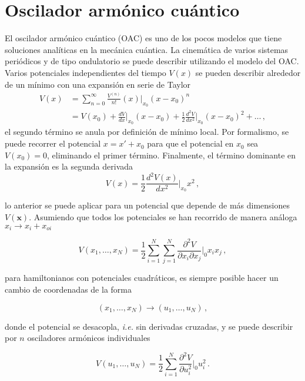 \section{Oscilador armónico cuántico}

El oscilador armónico cuántico (OAC) es uno de los pocos modelos que tiene soluciones analíticas en la mecánica cuántica. La cinemática de varios sistemas periódicos y de tipo ondulatorio se puede describir utilizando el modelo del OAC.
Varios potenciales independientes del tiempo $V(x)$ se pueden describir alrededor de un mínimo con una expansión en serie de Taylor
\begin{align*}
  V(x) & = \sum_{n=0}^{\infty} \frac{V^{(n)}}{n!} (x)|_{x_0} (x-x_0)^n \\ &= V(x_0) + \frac{dV}{dx}\Big|_{x_0} (x-x_0) + \frac{1}{2}\frac{d^2V}{dx^2}\Big|_{x_0} (x-x_0)^2 + \dots \,,
\end{align*}
el segundo término se anula por definición de mínimo local. Por formalismo, se puede recorrer el potencial $x = x' + x_0$ para que el potencial en $x_0$ sea $V(x_0) = 0$, eliminando el primer término. Finalmente, el término dominante en la expansión es la segunda derivada
\begin{equation}
  \label{OA.1}
  V(x) = \frac{1}{2}\frac{d^2V(x)}{dx^2}\Big|_{x_0}x^2 \,,
\end{equation}

lo anterior se puede aplicar para un potencial que depende de más dimensiones $V(\mathbf{x})$. Asumiendo que todos los potenciales se han recorrido de manera análoga $x_i \to x_i + x_{oi}$

\begin{equation*}
  V(x_1, \dots, x_N) = \frac{1}{2}\sum_{i=1}^N \sum_{j=1}^N \frac{\partial^2 V}{\partial x_i \partial x_j}\Big|_{0} x_i x_j \,,
\end{equation*}

para hamiltonianos con potenciales cuadráticos, es siempre posible hacer un cambio de coordenadas de la forma

\begin{equation*}
  (x_{1}, \dots, x_N) \to (u_1, \dots, u_N)\,,
\end{equation*}

donde el potencial se desacopla, \textit{i.e.} sin derivadas cruzadas, y se puede describir por $n$ osciladores armónicos individuales

\begin{equation*}
  V(u_1, \dots, u_N) = \frac{1}{2} \sum_{i=1}^{N} \frac{\partial^2 V}{\partial u_i^{2}}\Big|_0 u_i^2\,.
\end{equation*}

